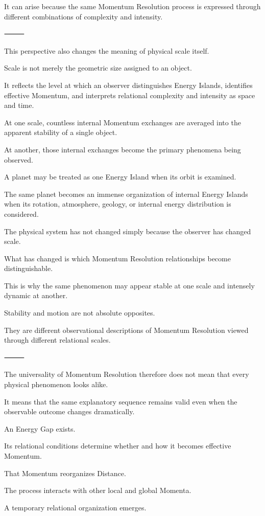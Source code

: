It can arise because the same Momentum Resolution process is expressed through different combinations of complexity and intensity.

⸻

This perspective also changes the meaning of physical scale itself.

Scale is not merely the geometric size assigned to an object.

It reflects the level at which an observer distinguishes Energy Islands, identifies effective Momentum, and interprets relational complexity and intensity as space and time.

At one scale, countless internal Momentum exchanges are averaged into the apparent stability of a single object.

At another, those internal exchanges become the primary phenomena being observed.

A planet may be treated as one Energy Island when its orbit is examined.

The same planet becomes an immense organization of internal Energy Islands when its rotation, atmosphere, geology, or internal energy distribution is considered.

The physical system has not changed simply because the observer has changed scale.

What has changed is which Momentum Resolution relationships become distinguishable.

This is why the same phenomenon may appear stable at one scale and intensely dynamic at another.

Stability and motion are not absolute opposites.

They are different observational descriptions of Momentum Resolution viewed through different relational scales.

⸻

The universality of Momentum Resolution therefore does not mean that every physical phenomenon looks alike.

It means that the same explanatory sequence remains valid even when the observable outcome changes dramatically.

An Energy Gap exists.

Its relational conditions determine whether and how it becomes effective Momentum.

That Momentum reorganizes Distance.

The process interacts with other local and global Momenta.

A temporary relational organization emerges.

